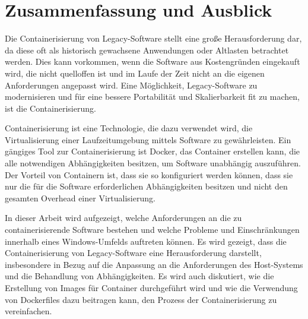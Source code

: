 \section{Zusammenfassung und Ausblick}

Die Containerisierung von Legacy-Software stellt eine große Herausforderung dar, da diese oft als historisch gewachsene Anwendungen oder Altlasten betrachtet werden. Dies kann vorkommen, wenn die Software aus Kostengründen eingekauft wird, die nicht quelloffen ist und im Laufe der Zeit nicht an die eigenen Anforderungen angepasst wird. Eine Möglichkeit, Legacy-Software zu modernisieren und für eine bessere Portabilität und Skalierbarkeit fit zu machen, ist die Containerisierung.

Containerisierung ist eine Technologie, die dazu verwendet wird, die Virtualisierung einer Laufzeitumgebung mittels Software zu gewährleisten. Ein gängiges Tool zur Containerisierung ist Docker, das Container erstellen kann, die alle notwendigen Abhängigkeiten besitzen, um Software unabhängig auszuführen. Der Vorteil von Containern ist, dass sie so konfiguriert werden können, dass sie nur die für die Software erforderlichen Abhängigkeiten besitzen und nicht den gesamten Overhead einer Virtualisierung.

In dieser Arbeit wird aufgezeigt, welche Anforderungen an die zu containerisierende Software bestehen und welche Probleme und Einschränkungen innerhalb eines Windows-Umfelds auftreten können. Es wird gezeigt, dass die Containerisierung von Legacy-Software eine Herausforderung darstellt, insbesondere in Bezug auf die Anpassung an die Anforderungen des Host-Systems und die Behandlung von Abhängigkeiten. Es wird auch diskutiert, wie die Erstellung von Images für Container durchgeführt wird und wie die Verwendung von Dockerfiles dazu beitragen kann, den Prozess der Containerisierung zu vereinfachen.

